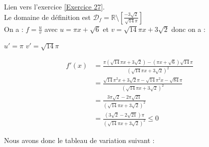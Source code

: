 \documentclass[12pt,fleqn]{report} %
\begin{document}
\begin{correction}Lien vers l'exercice   \ref{Exercice 27}.\\
	Le domaine de définition est 
	$\mathcal{D}_{f}=\mathbb{R} \setminus\left[\frac{-3\sqrt{2}}{\sqrt{14}\pi}\right]$
	\\[2mm]
	On a : $f = \frac{u}{v}$ avec $ u = \pi x  + \sqrt{6}$ et $v = \sqrt{14} \pi x + 3\sqrt{2}$ donc on a :
	\begin{center}
		$u'=\pi $ \quad $v'=\sqrt{14}\pi$ 
	\end{center}
	
	\begin{align*}
	f'(x) & =\frac{\pi(\sqrt{14}\pi x+3\sqrt{2})-(\pi x+\sqrt{6})\sqrt{14}\pi}{(\sqrt{14}\pi x+3\sqrt{2})^2}
	\\[2mm]
	& =\frac {\sqrt{14}\pi^2 x+3\sqrt{2}\pi-\sqrt{14}\pi^2 x-\sqrt{84}\pi}{(\sqrt{14}\pi x +3\sqrt{2})^2}
	\\[2mm]
	& =\frac{3\pi\sqrt{2}-2\pi\sqrt{21}}{(\sqrt{14}\pi x+3\sqrt{2})^2}
	\\[2mm]
	& =\frac{(3\sqrt{2}-2\sqrt{21})\pi}{(\sqrt{14}\pi x+3\sqrt{2})^2}  \leq 0  
	\end{align*}
	
	Nous avons donc le tableau de variation suivant :
	
	\begin{center}
	\end{center}	
	
\end{correction}
\end{document}
